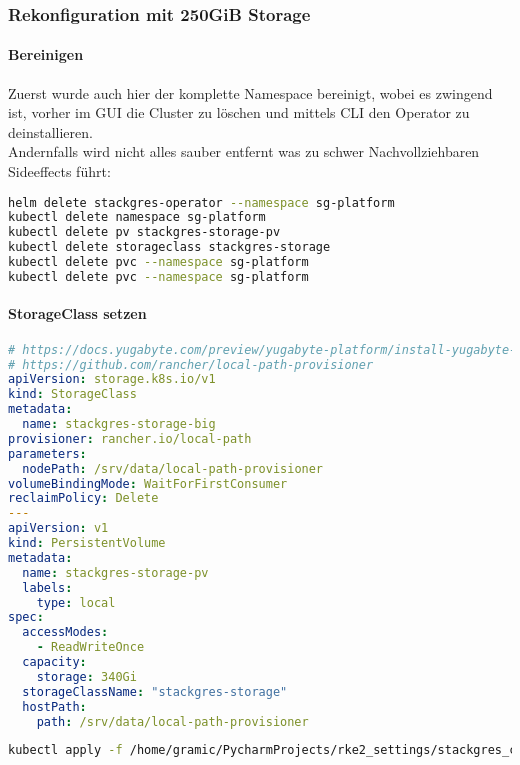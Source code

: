 \subsubsection{Rekonfiguration mit 250GiB Storage}
\paragraph{Bereinigen}
Zuerst wurde auch hier der komplette Namespace bereinigt, wobei es zwingend ist, vorher im GUI die Cluster zu löschen und mittels CLI den Operator zu deinstallieren.\\
Andernfalls wird nicht alles sauber entfernt was zu schwer Nachvollziehbaren Sideeffects führt:
\lstset{style=gra_codestyle}
\begin{lstlisting}[language=bash, caption=StackGres-Citus - Deinstallieren,captionpos=b,label={lst:stackgres_citus-deinstall-cleanup},breaklines=true]
helm delete stackgres-operator --namespace sg-platform
kubectl delete namespace sg-platform
kubectl delete pv stackgres-storage-pv
kubectl delete storageclass stackgres-storage
kubectl delete pvc --namespace sg-platform
kubectl delete pvc --namespace sg-platform
\end{lstlisting}

\paragraph{StorageClass setzen}
\lstset{style=gra_codestyle}
\begin{lstlisting}[language=yaml, caption=StackGres-Citus - StorageClass setzen,captionpos=b,label={lst:storageclass_big.yaml},breaklines=true]
# https://docs.yugabyte.com/preview/yugabyte-platform/install-yugabyte-platform/prepare-environment/kubernetes/#configure-storage-class
# https://github.com/rancher/local-path-provisioner
apiVersion: storage.k8s.io/v1
kind: StorageClass
metadata:
  name: stackgres-storage-big
provisioner: rancher.io/local-path
parameters:
  nodePath: /srv/data/local-path-provisioner
volumeBindingMode: WaitForFirstConsumer
reclaimPolicy: Delete
---
apiVersion: v1
kind: PersistentVolume
metadata:
  name: stackgres-storage-pv
  labels:
    type: local
spec:
  accessModes:
    - ReadWriteOnce
  capacity:
    storage: 340Gi
  storageClassName: "stackgres-storage"
  hostPath:
    path: /srv/data/local-path-provisioner
\end{lstlisting}

\lstset{style=gra_codestyle}
\begin{lstlisting}[language=bash, caption=StackGres-Citus - StorageClass / PersistentVolume Grosse Volumes aktivieren,captionpos=b,label={lst:stackgres_citus-storageclass-big-apply},breaklines=true]
kubectl apply -f /home/gramic/PycharmProjects/rke2_settings/stackgres_citus/stackgres_citus/storageclass_big.yaml
\end{lstlisting}

